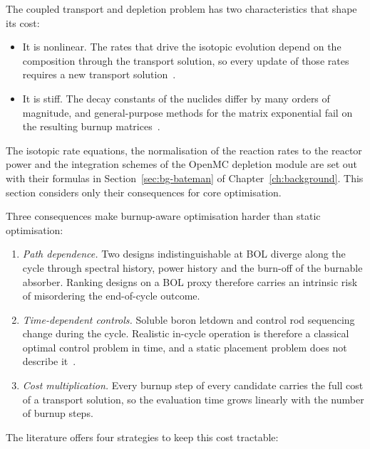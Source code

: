 The coupled transport and depletion problem has two characteristics that
shape its cost:

\begin{itemize}
  \item It is nonlinear. The rates that drive the isotopic evolution
        depend on the composition through the transport solution, so
        every update of those rates requires a new transport
        solution~\cite{romano_2021_depletion}.

  \item It is stiff. The decay constants of the nuclides differ by many
        orders of magnitude, and general-purpose methods for the matrix
        exponential fail on the resulting burnup
        matrices~\cite{pusa_2016}.
\end{itemize}

The isotopic rate equations, the normalisation of the reaction rates to
the reactor power and the integration schemes of the OpenMC depletion
module are set out with their formulas in
Section~\ref{sec:bg-bateman} of Chapter~\ref{ch:background}. This
section considers only their consequences for core optimisation.

Three consequences make burnup-aware optimisation harder than static
optimisation:

\begin{enumerate}
  \item \emph{Path dependence.} Two designs indistinguishable at BOL
        diverge along the cycle through spectral history, power history
        and the burn-off of the burnable absorber. Ranking designs on a
        BOL proxy therefore carries an intrinsic risk of misordering the
        end-of-cycle outcome.

  \item \emph{Time-dependent controls.} Soluble boron letdown and
        control rod sequencing change during the cycle. Realistic
        in-cycle operation is therefore a classical optimal control
        problem in time, and a static placement problem does not
        describe it~\cite{downar_1988}.

  \item \emph{Cost multiplication.} Every burnup step of every candidate
        carries the full cost of a transport solution, so the evaluation
        time grows linearly with the number of burnup steps.
\end{enumerate}

The literature offers four strategies to keep this cost tractable:

